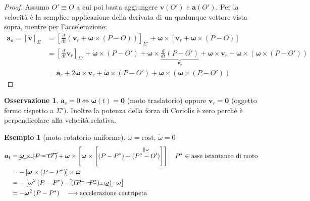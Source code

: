 \documentclass[a4paper,10pt]{article}
\theoremstyle{definition}
\newcommand{\bv}{\boldsymbol} %
\theoremstyle{indentdefinition}
\theoremstyle{indenttheorem}
\theoremstyle{myremark}
\newtheorem*{rem*}{Osservazione}
\newtheorem{example*}{Esempio}
\theoremstyle{indentgeneral}
\begin{document}
\begin{proof}
Assumo $O'\equiv O$ a cui poi basta aggiungere $\boldsymbol{v}\left(O'\right)$
e $\boldsymbol{a}\left(O'\right)$. Per la velocità è la semplice applicazione della derivata di un qualunque vettore vista sopra, mentre per l'accelerazione:
\begin{align*}
\boldsymbol{a}_{a}=[\dot{\bv{v}}]_{\Sigma}&=\left[\frac{d}{dt}(\bv{v}_r+\bv{\omega}\times(P-O))\right]_{\Sigma'}+\bv{\omega}\times[\bv{v}_r+\bv{\omega}\times(P-O)] \\
&= \left[\frac{d}{dt}\bv{v}_r\right]_{\Sigma'}+\dot{\bv{\omega}}\times(P-O')+\bv{\omega}\times\underbrace{\frac{d}{dt}(P-O')}_{\bv{v}_r}+\bv{\omega}\times\bv{v}_r+\bv{\omega}\times(\bv{\omega}\times(P-O')) \\
&=\bv{a}_r+2\bv{\omega}\times\bv{v}_r+\dot{\bv{\omega}}\times(P-O')+\bv{\omega}\times(\bv{\omega}\times(P-O'))
\end{align*}
\end{proof}

\begin{rem*}
    $\bv{a}_c=0 \iff\bv{\omega}(t)=\bv{0}$ (moto traslatorio) oppure $\bv{v}_r=\bv{0}$ (oggetto fermo rispetto a $\Sigma')$. Inoltre la potenza della forza di Coriolis è zero perché è perpendicolare alla velocità relativa.
\end{rem*}

\begin{example*}[moto rotatorio uniforme]
$\omega=\text{cost}$, $\dot{\omega}=0$
\begin{align*}
\boldsymbol{a}_{t} &=\cancel{\dot{\boldsymbol{\omega}}\times\left(P-O'\right)}+\boldsymbol{\omega}\times\left[\boldsymbol{\omega}\times\left[\left(P-P^{*}\right)+\overset{\parallel\omega}{\left(P^{*}-O'\right)}\right]\right] \quad \text{$P^*\in$ asse istantaneo di moto}  \\
&=-\left[\boldsymbol{\omega}\times\left(P-P^{*}\right)\right]\times\boldsymbol{\omega}\\
 &=-\left[\boldsymbol{\omega}^{2}\left(P-P^{*}\right)-\bcancel{\left(\left(P-P^{*}\right)\cdot\boldsymbol{\omega}\right)}\cdot\boldsymbol{\omega}\right] \\
 &=-\boldsymbol{\omega}^{2}\left(P-P^{*}\right) \quad\longrightarrow \text{accelerazione centripeta}
\end{align*}
\end{example*}
\end{document}
